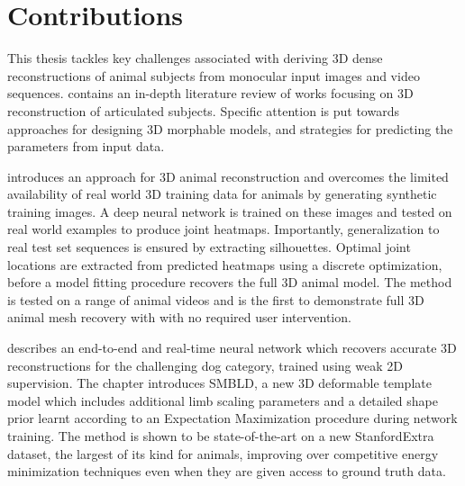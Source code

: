 



\section{Contributions}  %
This thesis tackles key challenges associated with deriving 3D dense reconstructions of animal subjects from monocular input images and video sequences.  contains an in-depth literature review of works focusing on 3D reconstruction of articulated subjects. Specific attention is put towards approaches for designing 3D morphable models, and strategies for predicting the parameters from input data. 

 introduces an approach for 3D animal reconstruction and overcomes the limited availability of real world 3D training data for animals by generating synthetic training images. A deep neural network is trained on these images and tested on real world examples to produce joint heatmaps. Importantly, generalization to real test set sequences is ensured by extracting silhouettes. Optimal joint locations are extracted from predicted heatmaps using a discrete optimization, before a model fitting procedure recovers the full 3D animal model. The method is tested on a range of animal videos and is the first to demonstrate full 3D animal mesh recovery with with no required user intervention. 

 describes an end-to-end and real-time neural network which recovers accurate 3D reconstructions for the challenging dog category, trained using weak 2D supervision. The chapter introduces SMBLD, a new 3D deformable template model which includes additional limb scaling parameters and a detailed shape prior learnt according to an Expectation Maximization procedure during network training. The method is shown to be state-of-the-art on a new StanfordExtra dataset, the largest of its kind for animals, improving over competitive energy minimization techniques even when they are given access to ground truth data. 

